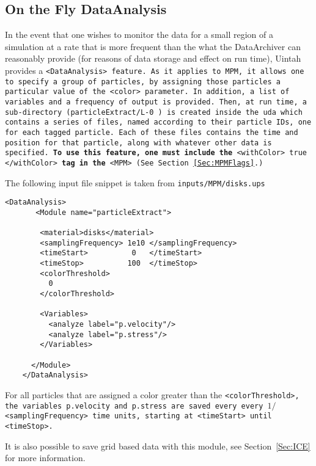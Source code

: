 \subsection{On the Fly DataAnalysis} \label{Sec:OTFA_MPM}

In the event that one wishes to monitor the data for a small region of a
simulation at a rate that is more frequent than the what the DataArchiver
can reasonably provide (for reasons of data storage and effect on run time),
Uintah provides a \tt <DataAnalysis> \normalfont feature.  As it applies
to MPM, it allows one to specify a group of particles, by assigning those
particles a particular value of the \tt <color> \normalfont parameter.
In addition, a list of variables and a frequency of output is provided.
Then, at run time, a sub-directory (\tt particleExtract/L-0 \normalfont)
is created inside the uda which contains
a series of files, named according to their particle IDs, one for each
tagged particle.  Each of these files contains the time and position for
that particle, along with whatever other data is specified.  {\bf To use this
feature, one must include the} \tt <withColor>   true   </withColor> \normalfont
{\bf tag in the} \tt <MPM> 
(See Section~\ref{Sec:MPMFlags}.)

The following input file snippet is taken from
\tt inputs/MPM/disks.ups \normalfont  
\begin{Verbatim}[fontsize=\footnotesize]
    <DataAnalysis>
       <Module name="particleExtract">

        <material>disks</material>
        <samplingFrequency> 1e10 </samplingFrequency>
        <timeStart>          0   </timeStart>
        <timeStop>          100  </timeStop>
        <colorThreshold>
          0
        </colorThreshold>

        <Variables>
          <analyze label="p.velocity"/>
          <analyze label="p.stress"/>
        </Variables>

      </Module>
    </DataAnalysis>
\end{Verbatim}

For all particles that are assigned a color greater than the
\tt <colorThreshold>, \normalfont the variables
\tt p.velocity \normalfont and
\tt p.stress \normalfont are saved every every
$1/$\tt <samplingFrequency> \normalfont time units, starting at
\tt <timeStart> \normalfont until
\tt <timeStop>. \normalfont

It is also possible to save grid based data with this module,
see Section~\ref{Sec:ICE} for more information.

